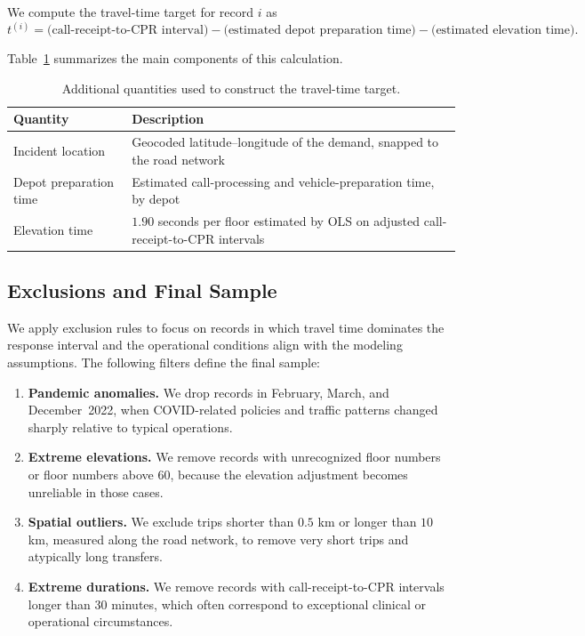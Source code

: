 \documentclass[11pt, letterpaper, oneside, reqno]{amsart}
\begin{document}
We compute the travel-time target for record $i$ as
\[
t^{(i)} = \bigl(\text{call-receipt-to-CPR interval}\bigr)
- \bigl(\text{estimated depot preparation time}\bigr)
- \bigl(\text{estimated elevation time}\bigr).
\]

Table~\ref{tab:additional_features} summarizes the main components of this calculation.

\begin{table}[h]
\centering
\small
\caption{Additional quantities used to construct the travel-time target.}
\begin{tabularx}{\textwidth}{lX}
\hline
\textbf{Quantity} & \textbf{Description} \\
\hline
Incident location & Geocoded latitude--longitude of the demand, snapped to the road network \\
Depot preparation time & Estimated call-processing and vehicle-preparation time, by depot \\
Elevation time & $1.90$ seconds per floor estimated by OLS on adjusted call-receipt-to-CPR intervals \\
\hline
\end{tabularx}
\label{tab:additional_features}
\end{table}

\subsection{Exclusions and Final Sample}
\label{ec:exclusions}

We apply exclusion rules to focus on records in which travel time dominates the response interval and the operational conditions align with the modeling assumptions. The following filters define the final sample:
\begin{enumerate}[leftmargin=7mm]
\item \textbf{Pandemic anomalies.} We drop records in February, March, and December~2022, when COVID-related policies and traffic patterns changed sharply relative to typical operations.
\item \textbf{Extreme elevations.} We remove records with unrecognized floor numbers or floor numbers above 60, because the elevation adjustment becomes unreliable in those cases.
\item \textbf{Spatial outliers.} We exclude trips shorter than $0.5$ km or longer than $10$ km, measured along the road network, to remove very short trips and atypically long transfers.
\item \textbf{Extreme durations.} We remove records with call-receipt-to-CPR intervals longer than 30 minutes, which often correspond to exceptional clinical or operational circumstances.
\end{enumerate}
\end{document}
